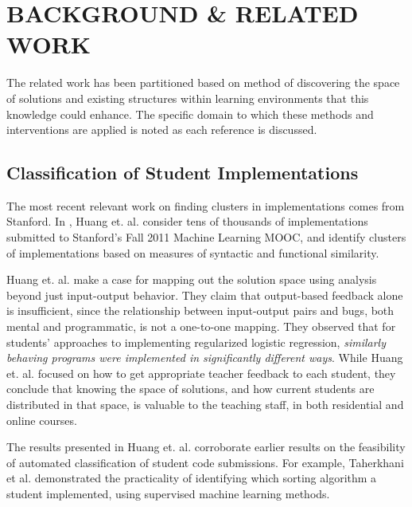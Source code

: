 \documentclass[12pt]{article}
\begin{document}
\section{BACKGROUND \& RELATED WORK}

The related work has been partitioned based on method of discovering the space of solutions and existing structures within learning environments that this knowledge could enhance. The specific domain to which these methods and interventions are applied is noted as each reference is discussed. 

\subsection{Classification of Student Implementations}

The most recent relevant work on finding clusters in implementations comes from Stanford. In \cite{MOOCshop}, Huang et. al. consider tens of thousands of implementations submitted to Stanford's Fall 2011 Machine Learning MOOC, and identify clusters of implementations based on measures of syntactic and functional similarity. 

Huang et. al. \cite{MOOCshop} make a case for mapping out the solution space using analysis beyond just input-output behavior. They claim that output-based feedback alone is insufficient, since the relationship between input-output pairs and bugs, both mental and programmatic, is not a one-to-one mapping.  They observed that for students' approaches to implementing regularized logistic regression, {\em similarly behaving programs were implemented in significantly different ways}. While Huang et. al. focused on how to get appropriate teacher feedback to each student, they conclude that knowing the space of solutions, and how current students are distributed in that space, is valuable to the teaching staff, in both residential and online courses. 

The results presented in Huang et. al. corroborate earlier results on the feasibility of automated classification of student code submissions. For example, Taherkhani et al. \cite{taherkhani12} demonstrated the practicality of identifying which sorting algorithm a student implemented, using supervised machine learning methods. 
 
\end{document}
